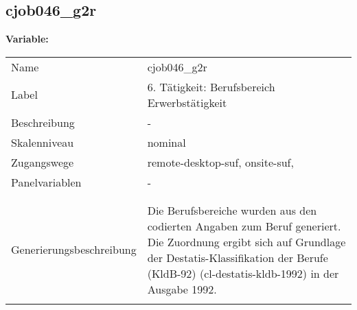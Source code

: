 	
	
	\subsection{cjob046\_g2r}
	\label{subSection:cjob046_g2r}

	\noindent\textbf{Variable:}\\
		\begin{tabular}{lL{11.3cm}}
			\label{tableVariable:cjob046_g2r}
			Name & cjob046\_g2r \\
			Label & 6. Tätigkeit: Berufsbereich Erwerbstätigkeit \\
			Beschreibung & - \\
			Skalenniveau & nominal \\
			Zugangswege &
				remote-desktop-suf,
				onsite-suf,
 \\
			Panelvariablen & -
			 \\
			 \\
 \\
					Generierungsbeschreibung & Die Berufsbereiche wurden aus den codierten Angaben zum Beruf generiert. Die Zuordnung ergibt sich auf Grundlage der Destatis-Klassifikation der Berufe (KldB-92) (cl-destatis-kldb-1992) in der Ausgabe 1992. 
				 \\	
			 \\
		\end{tabular}






